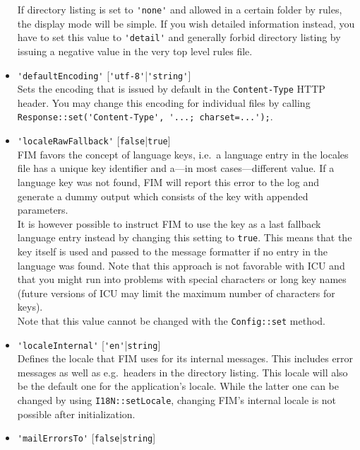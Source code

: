 \documentclass{scrartcl}
\begin{document}
\begin{itemize}
               If directory listing is set to \lstinline!'none'! and allowed in a certain folder by rules, the display mode will be simple. If you wish detailed information instead, you have to set this value to \lstinline!'detail'! and generally forbid directory listing by issuing a negative value in the very top level rules file.
            \item \lstinline!'defaultEncoding'! [\lstinline!'utf-8'!|\lstinline!'string'!] \\
               Sets the encoding that is issued by default in the \texttt{Content-Type} HTTP header. You may change this encoding for individual files by calling \\
               \lstinline!Response::set('Content-Type', '...; charset=...');!.
            \item \lstinline!'localeRawFallback'! [\lstinline!false!|\lstinline!true!] \\
               FIM favors the concept of language keys, i.e.\ a language entry in the locales file has a unique key identifier and a---in most cases---different value. If a language key was not found, FIM will report this error to the log and generate a dummy output which consists of the key with appended parameters. \\
               It is however possible to instruct FIM to use the key as a last fallback language entry instead by changing this setting to \lstinline!true!. This means that the key itself is used and passed to the message formatter if no entry in the language was found. Note that this approach is not favorable with ICU and that you might run into problems with special characters or long key names (future versions of ICU may limit the maximum number of characters for keys). \\
               Note that this value cannot be changed with the \lstinline!Config::set! method.
            \item \lstinline!'localeInternal'! [\lstinline!'en'!|\lstinline!string!] \\
               Defines the locale that FIM uses for its internal messages. This includes error messages as well as e.g.\ headers in the directory listing. This locale will also be the default one for the application's locale. While the latter one can be changed by using \lstinline!I18N::setLocale!, changing FIM's internal locale is not possible after initialization.
            \item \lstinline!'mailErrorsTo'! [\lstinline!false!|\lstinline!string!] \\

\end{itemize}
\end{document}
